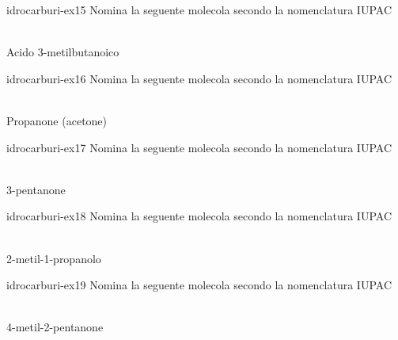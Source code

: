 \documentclass[preview]{standalone}
\begin{document}
\begin{snippetexercise}{idrocarburi-ex15}
    {Nomina la seguente molecola secondo la nomenclatura IUPAC}
    \begin{center}
        \\\vspace{0.25cm}
        Acido 3-metilbutanoico
    \end{center}
\end{snippetexercise}

\begin{snippetexercise}{idrocarburi-ex16}
    {Nomina la seguente molecola secondo la nomenclatura IUPAC}
    \begin{center}
        \\\vspace{0.25cm}
        Propanone (acetone)
    \end{center}
\end{snippetexercise}

\begin{snippetexercise}{idrocarburi-ex17}
    {Nomina la seguente molecola secondo la nomenclatura IUPAC}
    \begin{center}
        \\\vspace{0.25cm}
        3-pentanone
    \end{center}
\end{snippetexercise}

\begin{snippetexercise}{idrocarburi-ex18}
    {Nomina la seguente molecola secondo la nomenclatura IUPAC}
    \begin{center}
        \\\vspace{0.25cm}
        2-metil-1-propanolo
    \end{center}
\end{snippetexercise}

\begin{snippetexercise}{idrocarburi-ex19}
    {Nomina la seguente molecola secondo la nomenclatura IUPAC}
    \begin{center}
        \\\vspace{0.25cm}
        4-metil-2-pentanone
    \end{center}
\end{snippetexercise}
\end{document}
